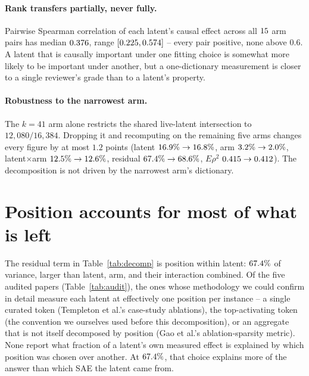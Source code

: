 \documentclass[11pt]{article}
\begin{document}
\paragraph{Rank transfers partially, never fully.} Pairwise Spearman
correlation of each latent's causal effect across all $15$ arm pairs
has median $0.376$, range $[0.225,0.574]$ -- every
pair positive, none above $0.6$. A latent that is causally important under one
fitting choice is somewhat more likely to be important under another, but a
one-dictionary measurement is closer to a single reviewer's grade than to a
latent's property.

\paragraph{Robustness to the narrowest arm.} The $k{=}41$ arm alone restricts
the shared live-latent intersection to $12{,}080/16{,}384$. Dropping it and
recomputing on the remaining five arms changes every figure by at most $1.2$
points (latent $16.9\%\to16.8\%$, arm
$3.2\%\to2.0\%$, latent$\times$arm
$12.5\%\to12.6\%$, residual
$67.4\%\to68.6\%$, $E\rho^2$
$0.415\to0.412$). The decomposition is not driven by the
narrowest arm's dictionary.

\section{Position accounts for most of what is left}
\label{sec:position}
The residual term in Table~\ref{tab:decomp} is position within latent:
$67.4\%$ of variance, larger than latent, arm, and their interaction
combined. Of the five audited papers (Table~\ref{tab:audit}), the ones whose
methodology we could confirm in detail measure each latent at effectively one
position per instance -- a single curated token (Templeton et al.'s case-study
ablations), the top-activating token (the convention we ourselves used before
this decomposition), or an aggregate that is not itself decomposed by position
(Gao et al.'s ablation-sparsity metric). None report what fraction of a
latent's own measured effect is explained by which position was chosen over
another. At $67.4\%$, that choice explains more of the answer than
which SAE the latent came from.
\end{document}
